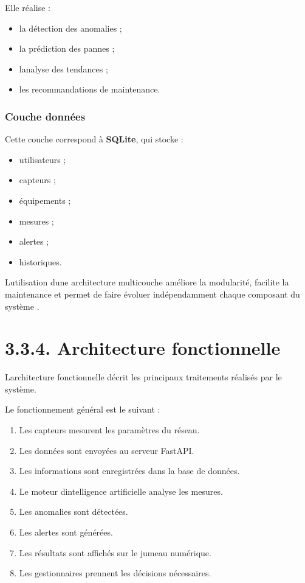 \documentclass[12pt,a4paper,oneside]{report}
\begin{document}
Elle réalise :

\begin{itemize}
\item
  la détection des anomalies ;
\item
  la prédiction des pannes ;
\item
  l\textquotesingle analyse des tendances ;
\item
  les recommandations de maintenance.
\end{itemize}

\subsubsection{Couche données}\label{couche-donnuxe9es}

Cette couche correspond à \textbf{SQLite}, qui stocke :

\begin{itemize}
\item
  utilisateurs ;
\item
  capteurs ;
\item
  équipements ;
\item
  mesures ;
\item
  alertes ;
\item
  historiques.
\end{itemize}

L\textquotesingle utilisation d\textquotesingle une architecture
multicouche améliore la modularité, facilite la maintenance et permet de
faire évoluer indépendamment chaque composant du système \cite{ref106}.

\section{\texorpdfstring{\textbf{3.3.4. Architecture
fonctionnelle}}{3.3.4. Architecture fonctionnelle}}\label{architecture-fonctionnelle}

L\textquotesingle architecture fonctionnelle décrit les principaux
traitements réalisés par le système.

Le fonctionnement général est le suivant :

\begin{enumerate}
\def\labelenumi{\arabic{enumi}.}
\item
  Les capteurs mesurent les paramètres du réseau.
\item
  Les données sont envoyées au serveur FastAPI.
\item
  Les informations sont enregistrées dans la base de données.
\item
  Le moteur d\textquotesingle intelligence artificielle analyse les
  mesures.
\item
  Les anomalies sont détectées.
\item
  Les alertes sont générées.
\item
  Les résultats sont affichés sur le jumeau numérique.
\item
  Les gestionnaires prennent les décisions nécessaires.
\end{enumerate}
\end{document}
